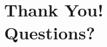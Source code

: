 \documentclass[aspectratio=169,11pt,hyperref={colorlinks=true}]{beamer}
\begin{document}

\section[Q\&A]{Thank You! \\Questions?}
\end{document}
